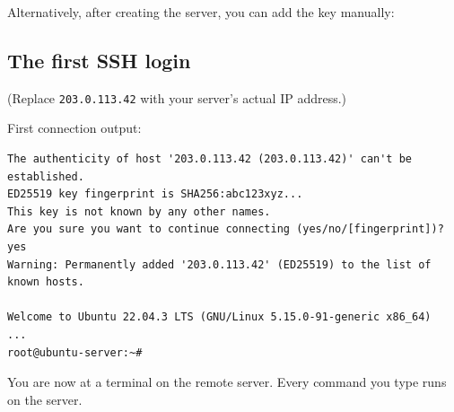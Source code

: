Alternatively, after creating the server, you can add the key manually:

\begin{codebox}[short]

\begin{Shaded}
\begin{Highlighting}[]
\end{Highlighting}
\end{Shaded}

\end{codebox}

\subsection*{The first SSH login}\label{21-system-setup:the-first-ssh-login}

\begin{codebox}[short]

\begin{Shaded}
\begin{Highlighting}[]
\end{Highlighting}
\end{Shaded}

\end{codebox}

\noindent{}(Replace \texttt{203.0.113.42} with your server's actual IP address.)

First connection output:

\begin{outputbox}[short]
\begin{Verbatim}[fontsize=\codesize, breaklines, breakanywhere, breaksymbolleft={\tiny\textcolor{muted}{$\hookrightarrow$}}]
The authenticity of host '203.0.113.42 (203.0.113.42)' can't be established.
ED25519 key fingerprint is SHA256:abc123xyz...
This key is not known by any other names.
Are you sure you want to continue connecting (yes/no/[fingerprint])? yes
Warning: Permanently added '203.0.113.42' (ED25519) to the list of known hosts.

Welcome to Ubuntu 22.04.3 LTS (GNU/Linux 5.15.0-91-generic x86_64)
...
root@ubuntu-server:~#
\end{Verbatim}
\end{outputbox}

\noindent{}You are now at a terminal on the remote server. Every command you type runs on the server.

